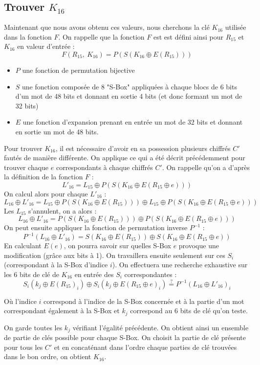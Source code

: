 \documentclass[10pt,a4paper]{article}
\begin{document}
\subsection{Trouver $K_{16}$}
Maintenant que nous avons obtenu ces valeurs, nous cherchons la clé $K_{16}$ utilisée dans la fonction $F$.
On rappelle que la fonction $F$ est est défini ainsi pour $R_{15}$ et $K_{16}$ en valeur d'entrée :
\[F(R_{15},\ K_{16}) = P(S(K_{16}\oplus E(R_{15})))\]
\begin{itemize}
\item $P$ une fonction de permutation bijective
\item $S$ une fonction composée de 8 "S-Box" appliquées à chaque blocs de 6 bits d'un mot de 48 bits et donnant en sortie 4 bits (et donc formant un mot de 32 bits)
\item $E$ une fonction d'expansion prenant en entrée un mot de 32 bits et donnant en sortie un mot de 48 bits.
\end{itemize}
Pour trouver $K_{16}$, il est nécessaire d'avoir en sa possession plusieurs chiffrés $C'$ fautés de manière différente. On applique ce qui a été décrit précédemment pour trouver chaque $e$ correspondants à chaque chiffrés $C'$. On rappelle qu'on a d'après la définition de la fonction $F$ :
\[L'_{16} = L_{15} \oplus P(S(K_{16} \oplus E(R_{15} \oplus e)))\]
On calcul alors pour chaque $L'_{16}$ :
\[L_{16} \oplus L'_{16} = L_{15} \oplus P(S(K_{16} \oplus E(R_{15}))) \oplus L_{15} \oplus P(S(K_{16} \oplus E(R_{15} \oplus e)))\]
Les $L_{15}$ s'annulent, on a alors :
\[L_{16} \oplus L'_{16} = P(S(K_{16} \oplus E(R_{15}))) \oplus P(S(K_{16} \oplus E(R_{15} \oplus e)))\]
On peut ensuite appliquer la fonction de permutation inverse $P^{-1}$ :
\[P^{-1}(L_{16} \oplus L'_{16}) = S(K_{16} \oplus E(R_{15})) \oplus S(K_{16} \oplus E(R_{15} \oplus e))\]
En calculant $E(e)$, on pourra savoir sur quelles S-Box $e$ provoque une modification (grâce aux bits à 1). On travaillera ensuite seulement sur ces $S_{i}$ (correspondant à la S-Box d'indice $i$). On effectuera une recherche exhaustive  sur les 6 bits de clé de $K_{16}$ en entrée des $S_{i}$ correspondantes : 
\[S_{i}(k_{j} \oplus E(R_{15})_{i}) \oplus S_{i}(k_{j} \oplus E(R_{15} \oplus e)_{i}) \stackrel{?}{=} P^{-1}(L_{16} \oplus L'_{16})_{i}\]
\begin{center}Où l'indice $i$ correspond à l'indice de la S-Box concernée et à la partie d'un mot correspondant également à la S-Box et $k_{j}$ correspond au 6 bits de clé qu'on teste.\end{center}
On garde toutes les $k_{j}$ vérifiant l'égalité précédente. On obtient ainsi un ensemble de partie de clés possible pour chaque S-Box. On choisit la partie de clé présente pour tous les $C'$ et en concaténant dans l'ordre chaque parties de clé trouvées dans le bon ordre, on obtient $K_{16}$.
\end{document}
